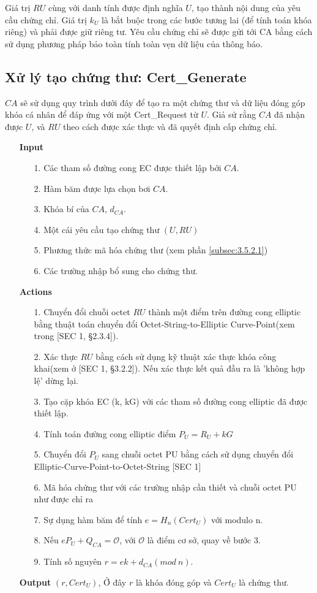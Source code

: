 \documentclass[a4paper,12pt]{report}
\begin{document}
Giá trị $RU$ cùng với danh tính được định nghĩa $U$, tạo thành nội dung của yêu cầu chứng chỉ. Giá trị $k_U$ là bắt buộc trong các bước tương lai (để tính toán khóa riêng) và phải được giữ riêng tư. Yêu cầu chứng chỉ sẽ được gửi tới CA bằng cách sử dụng phương pháp bảo toàn tính toàn vẹn dữ liệu của thông báo.
\subsection{Xử lý tạo chứng thư: Cert\_Generate}
$CA$ sẽ sử dụng quy trình dưới đây để tạo ra một chứng thư và dữ liệu đóng góp khóa cá nhân để đáp ứng với một Cert\_Request từ $U$. Giả sử rằng $CA$ đã nhận được $U$, và $RU$ theo cách được xác thực và đã quyết định cấp chứng chỉ.
\begin{itemize}
\item[] \textbf{Input}
\begin{itemize}
\item[1. ] Các tham số đường cong EC được thiết lập bởi $CA$.
\item[2. ] Hàm băm được lựa chọn bơi $CA$.
\item[3. ] Khóa bí của $CA$, $d_{CA}$. 
\item[4. ] Một cái yêu cầu tạo chứng thư $(U, RU)$
\item[5. ] Phương thức mã hóa chứng thư (xem phần \ref{subsec:3.5.2.1})
\item[6. ] Các trường nhập bổ sung cho chứng thư.
\end{itemize}
\item[] \textbf{Actions}
\begin{itemize}
\item[1. ] Chuyển đổi chuỗi octet $RU$ thành một điểm trên đường cong elliptic bằng thuật toán chuyển đổi Octet-String-to-Elliptic Curve-Point(xem trong [SEC 1, §2.3.4]).
\item[2. ] Xác thực $RU$ bằng cách sử dụng kỹ thuật xác thực khóa công khai(xem ở [SEC 1, §3.2.2]). Nếu xác thực kết quả đầu ra là 'không hợp lệ' dừng lại.
\item[3. ] Tạo cặp khóa EC (k, kG) với các tham số đường cong elliptic đã được thiết lập. 
\item[4. ] Tính toán đường cong elliptic điểm $P_U = R_U + kG$
\item[5. ] Chuyển đổi $P_U$ sang chuỗi octet PU bằng cách sử dụng chuyển đổi Elliptic-Curve-Point-to-Octet-String [SEC 1]
\item[6. ] Mã hóa chứng thư với các trường nhập cần thiết và chuỗi octet PU như được chỉ ra
\item[7. ] Sự dụng hàm băm để tính $e = H_n(Cert_U)$ với modulo n.
\item[8. ] Nếu $eP_U + Q_{CA} = \mathcal{O}$, với $\mathcal{O}$ là điểm cơ sở, quay về bước 3.
\item[9. ] Tính số nguyên $r = ek + d_{CA} (mod \ n)$.
\end{itemize}
\item[] \textbf{Output} $(r, Cert_U)$, Ở đây $r$ là khóa đóng góp  và $Cert_U$ là chứng thư.
\end{itemize}
\end{document}
